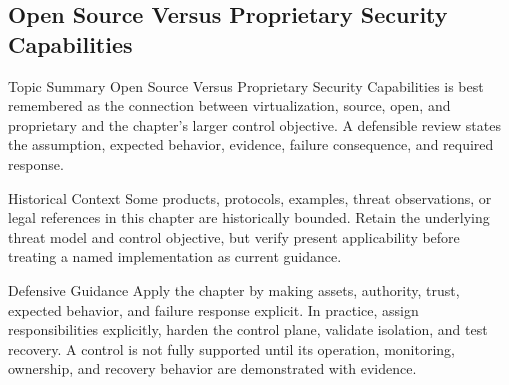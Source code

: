 \documentclass[11pt,letterpaper]{article}
\begin{document}
\subsection*{Open Source Versus Proprietary Security Capabilities}
\begin{CornellNotesTable}
\end{CornellNotesTable}
\begin{CornellSummaryBox}{Topic Summary}
Open Source Versus Proprietary Security Capabilities is best remembered as the connection between virtualization, source, open, and proprietary and the chapter's larger control objective. A defensible review states the assumption, expected behavior, evidence, failure consequence, and required response.
\end{CornellSummaryBox}
\begin{CornellWarningBox}{Historical Context}
Some products, protocols, examples, threat observations, or legal references in this chapter are historically bounded. Retain the underlying threat model and control objective, but verify present applicability before treating a named implementation as current guidance.
\end{CornellWarningBox}
\begin{CornellOverviewBox}{Defensive Guidance}
Apply the chapter by making assets, authority, trust, expected behavior, and failure response explicit. In practice, assign responsibilities explicitly, harden the control plane, validate isolation, and test recovery. A control is not fully supported until its operation, monitoring, ownership, and recovery behavior are demonstrated with evidence.
\end{CornellOverviewBox}
\end{document}
